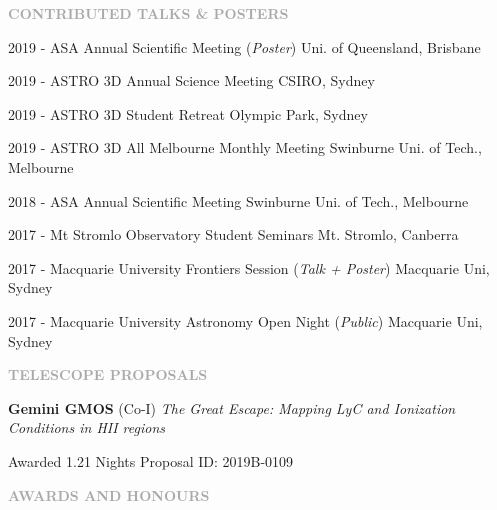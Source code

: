 \documentclass[11pt]{extarticle}
\def\Vhrulefill{{\color{BurntOrange}{\leavevmode\leaders\hrule height 1.2ex depth \dimexpr0.5pt-0.9ex\hfill\kern5pt}}}
\begin{document}
\vspace{3ex}
\noindent
\textcolor{darkgray}{\Large\normalfont\bfseries\MakeUppercase{Contributed Talks \& Posters}} \Vhrulefill
\vspace{2ex}

2019 - ASA Annual Scientific Meeting (\emph{Poster}) \hfill Uni. of Queensland, Brisbane \par
2019 - ASTRO 3D Annual Science Meeting \hfill CSIRO, Sydney \par
2019 - ASTRO 3D Student Retreat \hfill Olympic Park, Sydney \par 
2019 - ASTRO 3D All Melbourne Monthly Meeting \hfill Swinburne Uni. of Tech., Melbourne \par
2018 - ASA Annual Scientific Meeting \hfill Swinburne Uni. of Tech., Melbourne\par
2017 - Mt Stromlo Observatory Student Seminars \hfill Mt. Stromlo, Canberra \par
2017 - Macquarie University Frontiers Session (\emph{Talk + Poster}) \hfill Macquarie Uni, Sydney \par
2017 - Macquarie University Astronomy Open Night (\emph{Public}) \hfill Macquarie Uni, Sydney \par

\clearpage

\vspace{3ex}
\noindent
\textcolor{darkgray}{\Large\normalfont\bfseries\MakeUppercase{Telescope Proposals}} \Vhrulefill
\vspace{2ex}

\textbf{Gemini GMOS} (Co-I) \emph{The Great Escape: Mapping LyC and Ionization Conditions in HII regions} \par Awarded 1.21 Nights  Proposal ID: 2019B-0109 

\vspace{3ex}
\noindent
\textcolor{darkgray}{\Large\normalfont\bfseries\MakeUppercase{Awards and Honours}} \Vhrulefill
\vspace{2ex}
\end{document}
